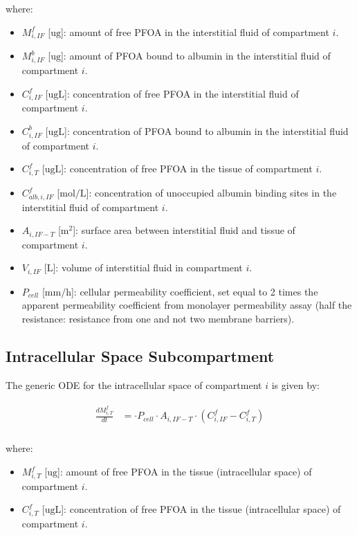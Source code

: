 \documentclass[preprint,12pt,authoryear]{elsarticle}
\begin{document}
\noindent
where:
\begin{itemize}
    \item $M_{i,IF}^f$ [$\text{ug}$]: amount of free PFOA in the interstitial fluid of compartment $i$.
    \item $M_{i,IF}^b$ [$\text{ug}$]: amount of PFOA bound to albumin in the interstitial fluid of compartment $i$.
    \item $C_{i,IF}^f$ [$\text{ug}\text{L}$]: concentration of free PFOA in the interstitial fluid of compartment $i$.
    \item $C_{i,IF}^b$ [$\text{ug}\text{L}$]: concentration of PFOA bound to albumin in the interstitial fluid of compartment $i$.
    \item $C_{i,T}^f$ [$\text{ug}\text{L}$]: concentration of free PFOA in the tissue of compartment $i$.
    \item $C_{alb,i,IF}^f$ [$\text{mol}/\text{L}$]: concentration of unoccupied albumin binding sites in the interstitial fluid of compartment $i$.
    \item $A_{i,IF-T}$ [$\text{m}^2$]: surface area between interstitial fluid and tissue of compartment $i$.
    \item $V_{i,IF}$ [$\text{L}$]: volume of interstitial fluid in compartment $i$.
    \item $P_{cell}$ [$\text{mm}/\text{h}$]: cellular permeability coefficient, set equal to 2 times the apparent permeability coefficient from monolayer permeability assay (half the resistance: resistance from one and not two membrane barriers).
\end{itemize}

\subsection{Intracellular Space Subcompartment}

The generic ODE for the intracellular space of compartment $i$ is given by:

\begin{align}
\begin{aligned}
\frac{dM_{i,T}^f}{dt} &=  \cdot P_{cell} \cdot A_{i,IF-T} \cdot (C_{i,IF}^f - C_{i,T}^f) \\
\end{aligned}
\label{eq:PFOA_tissue_ODE}
\end{align}

\noindent
where:
\begin{itemize}
    \item $M_{i,T}^f$ [$\text{ug}$]: amount of free PFOA in the tissue (intracellular space) of compartment $i$.
    \item $C_{i,T}^f$ [$\text{ug}\text{L}$]: concentration of free PFOA in the tissue (intracellular space) of compartment $i$.
\end{itemize}
\end{document}
